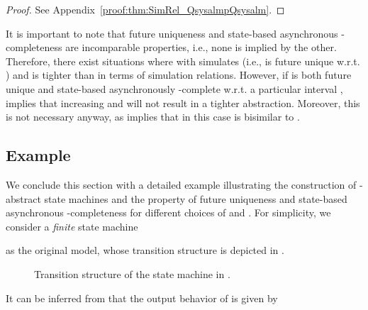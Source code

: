 \begin{proof}
 See Appendix~\ref{proof:thm:SimRel_QsysalmpQsysalm}.
\end{proof}
It is important to note that future uniqueness and state-based asynchronous -completeness are incomparable properties, i.e., none is implied by the other. Therefore, there exist situations where  with  simulates  (i.e.,  is future unique w.r.t. ) and  is tighter than  in terms of simulation relations. However, if  is both future unique and state-based asynchronously -complete w.r.t. a particular interval ,  implies that increasing  and  will not result in a tighter abstraction. Moreover, this is not necessary anyway, as  implies that in this case  is bisimilar to . 



\subsection{Example}\label{sec:SAlCA_new_exp}
We conclude this section with a detailed example illustrating the construction of -abstract state machines and the property of future uniqueness and state-based asynchronous -completeness for different choices of  and .
For simplicity, we consider a \emph{finite} state machine 
 
 as the original model, whose transition structure is depicted in .\begin{figure}
  \begin{center}
   \end{center}
  \caption{Transition structure of the state machine  in .}\label{fig:exp_Qsyse}
 \end{figure}
It can be inferred from  that the output behavior of  is given by
  
